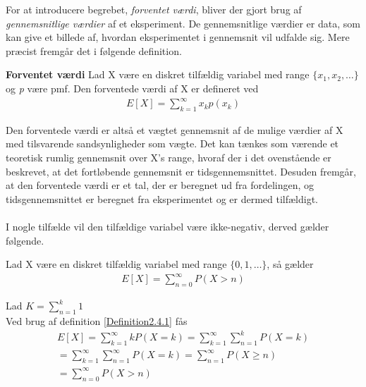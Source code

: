 For at introducere begrebet, \textit{forventet værdi}, bliver der gjort brug af \textit{gennemsnitlige værdier} af et eksperiment. De gennemsnitlige værdier er data, som kan give et billede af, hvordan eksperimentet i gennemsnit vil udfalde sig.
Mere præcist fremgår det i følgende definition.

\begin{minipage}\textwidth
\begin{defn}\textbf{Forventet værdi} \label{def:Forventetværdi} %
\newline
Lad X være en diskret tilfældig variabel med range $\{x_1,x_2,\ldots\}$ og  \textit{p} være pmf. Den forventede værdi af X er defineret ved
\begin{align}
E[X]=\sum_{k=1}^\infty x_k p(x_k)
\end{align}
\end{defn}
\end{minipage}



Den forventede værdi er altså et vægtet gennemsnit af de mulige værdier af X med tilsvarende sandsynligheder som vægte. Det kan tænkes som værende et teoretisk rumlig gennemsnit over X's range, hvoraf der i det ovenstående er beskrevet, at det fortløbende gennemsnit er tidsgennemsnittet. Desuden fremgår, at den forventede værdi er et tal, der er beregnet ud fra fordelingen, og tidsgennemsnittet er beregnet fra eksperimentet og er dermed tilfældigt.
\\
\\
I nogle tilfælde vil den tilfældige variabel være ikke-negativ, derved gælder følgende.


\begin{minipage}\textwidth
\begin{thmx} \textbf{} %
\newline
Lad X være en diskret tilfældig variabel med range $\{0,1,\ldots\}$, så gælder
\begin{align*}
    E[X]=\sum_{n=0}^\infty P(X > n)
\end{align*}
\end{thmx}
\end{minipage}


\begin{bev} \textbf{}
Lad $K=\sum_{n=1}^k 1$\\ Ved brug af definition \ref{Definition2.4.1} fås
\begin{align*}
    E[X]=\sum_{k=1}^\infty kP(X=k) = \sum_{k=1}^\infty \sum_{n=1}^k P(X=k)\\
    = \sum_{k=1}^\infty \sum_{n=1}^\infty P(X=k) = \sum_{n=1}^\infty P(X \geq n)\\
    = \sum_{n=0}^\infty P(X > n)\\
    \end{align*}
\end{bev}


